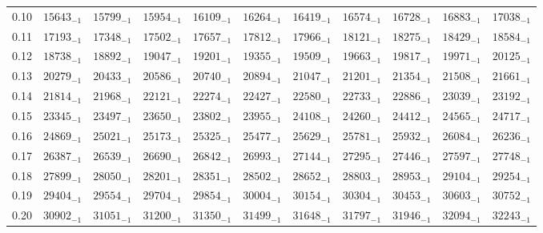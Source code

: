 \documentclass[10pt, a4paper]{article}
\begin{document}
\begin{center}
\begin{longtable}{c || c c c c c | c c c c c}
        \hline
        0.10 & \({15643}_{-1}\) & \({15799}_{-1}\) & \({15954}_{-1}\) & \({16109}_{-1}\) & \({16264}_{-1}\) & \({16419}_{-1}\) & \({16574}_{-1}\) & \({16728}_{-1}\) & \({16883}_{-1}\) & \({17038}_{-1}\)\\
        0.11 & \({17193}_{-1}\) & \({17348}_{-1}\) & \({17502}_{-1}\) & \({17657}_{-1}\) & \({17812}_{-1}\) & \({17966}_{-1}\) & \({18121}_{-1}\) & \({18275}_{-1}\) & \({18429}_{-1}\) & \({18584}_{-1}\)\\
        0.12 & \({18738}_{-1}\) & \({18892}_{-1}\) & \({19047}_{-1}\) & \({19201}_{-1}\) & \({19355}_{-1}\) & \({19509}_{-1}\) & \({19663}_{-1}\) & \({19817}_{-1}\) & \({19971}_{-1}\) & \({20125}_{-1}\)\\
        0.13 & \({20279}_{-1}\) & \({20433}_{-1}\) & \({20586}_{-1}\) & \({20740}_{-1}\) & \({20894}_{-1}\) & \({21047}_{-1}\) & \({21201}_{-1}\) & \({21354}_{-1}\) & \({21508}_{-1}\) & \({21661}_{-1}\)\\
        0.14 & \({21814}_{-1}\) & \({21968}_{-1}\) & \({22121}_{-1}\) & \({22274}_{-1}\) & \({22427}_{-1}\) & \({22580}_{-1}\) & \({22733}_{-1}\) & \({22886}_{-1}\) & \({23039}_{-1}\) & \({23192}_{-1}\)\\
        0.15 & \({23345}_{-1}\) & \({23497}_{-1}\) & \({23650}_{-1}\) & \({23802}_{-1}\) & \({23955}_{-1}\) & \({24108}_{-1}\) & \({24260}_{-1}\) & \({24412}_{-1}\) & \({24565}_{-1}\) & \({24717}_{-1}\)\\
        0.16 & \({24869}_{-1}\) & \({25021}_{-1}\) & \({25173}_{-1}\) & \({25325}_{-1}\) & \({25477}_{-1}\) & \({25629}_{-1}\) & \({25781}_{-1}\) & \({25932}_{-1}\) & \({26084}_{-1}\) & \({26236}_{-1}\)\\
        0.17 & \({26387}_{-1}\) & \({26539}_{-1}\) & \({26690}_{-1}\) & \({26842}_{-1}\) & \({26993}_{-1}\) & \({27144}_{-1}\) & \({27295}_{-1}\) & \({27446}_{-1}\) & \({27597}_{-1}\) & \({27748}_{-1}\)\\
        0.18 & \({27899}_{-1}\) & \({28050}_{-1}\) & \({28201}_{-1}\) & \({28351}_{-1}\) & \({28502}_{-1}\) & \({28652}_{-1}\) & \({28803}_{-1}\) & \({28953}_{-1}\) & \({29104}_{-1}\) & \({29254}_{-1}\)\\
        0.19 & \({29404}_{-1}\) & \({29554}_{-1}\) & \({29704}_{-1}\) & \({29854}_{-1}\) & \({30004}_{-1}\) & \({30154}_{-1}\) & \({30304}_{-1}\) & \({30453}_{-1}\) & \({30603}_{-1}\) & \({30752}_{-1}\)\\
        \hline
        0.20 & \({30902}_{-1}\) & \({31051}_{-1}\) & \({31200}_{-1}\) & \({31350}_{-1}\) & \({31499}_{-1}\) & \({31648}_{-1}\) & \({31797}_{-1}\) & \({31946}_{-1}\) & \({32094}_{-1}\) & \({32243}_{-1}\)\\

\end{longtable}
\end{center}
\end{document}
